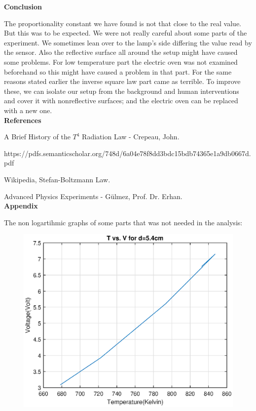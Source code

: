 \documentclass[10pt,a4paper]{article}
\begin{document}
{\textbf{Conclusion}
\\[\baselineskip]
\par The proportionality constant we have found is not that close to the real value. But this was to be expected. We were not really careful about some parts of the experiment. We sometimes lean over to the lamp's side differing the value read by the sensor. Also the reflective surface all around the setup might have caused some problems. For low temperature part the electric oven was not examined beforehand so this might have caused a problem in that part. For the same reasons stated earlier the inverse square law part came as terrible. To improve these, we can isolate our setup from the background and human interventions and cover it with nonreflective surfaces; and the electric oven can be replaced with a new one.
\\[\baselineskip] \textbf{References}\\[\baselineskip]
\par[1]A Brief History of the $T^4$ Radiation Law - Crepeau, John. 
\par https://pdfs.semanticscholar.org/748d/6a04e78f8dd3bdc15bdb74365e1a9db0667d.pdf 
\par[2]Wikipedia, Stefan-Boltzmann Law.
\par[3]Advanced Physics Experiments - Gülmez, Prof. Dr. Erhan.
\\[\baselineskip] \textbf{Appendix}\\[\baselineskip]
\par The non logartihmic graphs of some parts that was not needed in the analysis:
\begin{figure}[H]
	\advance{}
	\includegraphics[scale=0.7]{5notneeded.eps}
	

\end{figure}}
\end{document}
